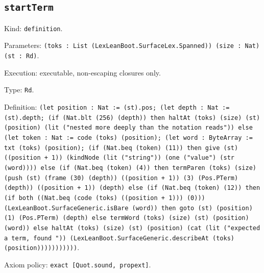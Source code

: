 \documentclass[11pt]{article}
\begin{document}
\subsection*{\texttt{startTerm}}
\noindent Kind: \texttt{definition}.\par
\noindent Parameters: \texttt{(toks : List (LexLeanBoot.SurfaceLex.Spanned)) (size : Nat) (st : Rd)}.\par
\noindent Execution: executable, non-escaping closures only.\par
\noindent Type: \texttt{Rd}.\par
\noindent Definition: \texttt{(let position : Nat := (st).pos; (let depth : Nat := (st).depth; (if (Nat.blt (256) (depth)) then haltAt (toks) (size) (st) (position) (lit ("nested more deeply than the notation reads")) else (let token : Nat := code (toks) (position); (let word : ByteArray := txt (toks) (position); (if (Nat.beq (token) (11)) then give (st) ((position + 1)) (kindNode (lit ("string")) (one ("value") (str (word)))) else (if (Nat.beq (token) (4)) then termParen (toks) (size) (push (st) (frame (30) (depth)) ((position + 1)) (3) (Pos.PTerm) (depth)) ((position + 1)) (depth) else (if (Nat.beq (token) (12)) then (if both ((Nat.beq (code (toks) ((position + 1))) (0))) (LexLeanBoot.SurfaceGeneric.isBare (word)) then goto (st) (position) (1) (Pos.PTerm) (depth) else termWord (toks) (size) (st) (position) (word)) else haltAt (toks) (size) (st) (position) (cat (lit ("expected a term, found ")) (LexLeanBoot.SurfaceGeneric.describeAt (toks) (position)))))))))))}.\par
\noindent Axiom policy: \texttt{exact [Quot.sound, propext]}.\par
\end{document}
